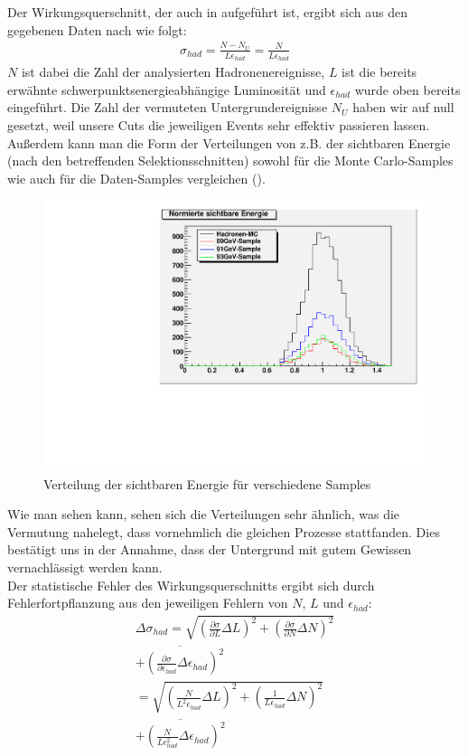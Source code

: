 Der Wirkungsquerschnitt, der auch in  aufgeführt ist, ergibt sich aus den gegebenen Daten nach \cite[Gl.13]{script} wie folgt:
\begin{eqnarray}
\sigma_{had} = \frac{N - N_U}{L\epsilon_{had}} = \frac{N}{L\epsilon_{had}}
\end{eqnarray}
$N$ ist dabei die Zahl der analysierten Hadronenereignisse, $L$ ist die bereits erwähnte schwerpunktsenergieabhängige Luminosität und $\epsilon_{had}$ wurde oben bereits eingeführt. Die Zahl der vermuteten Untergrundereignisse $N_U$ haben wir auf null gesetzt, weil unsere Cuts die jeweiligen Events sehr effektiv passieren lassen. Außerdem kann man die Form der Verteilungen von z.B. der sichtbaren Energie (nach den betreffenden Selektionsschnitten) sowohl für die Monte Carlo-Samples wie auch für die Daten-Samples vergleichen ().
\begin{figure}[htb]
	\centering
	\includegraphics[width=1\columnwidth,keepaspectratio]{Evis_vgl.pdf}
	\caption{Verteilung der sichtbaren Energie für verschiedene Samples}
	\label{fig:Evis_vgl}
\end{figure}
Wie man sehen kann, sehen sich die Verteilungen sehr ähnlich, was die Vermutung nahelegt, dass vornehmlich die gleichen Prozesse stattfanden. Dies bestätigt uns in der Annahme, dass der Untergrund mit gutem Gewissen vernachlässigt werden kann.\\
Der statistische Fehler des Wirkungsquerschnitts ergibt sich durch Fehlerfortpflanzung aus den jeweiligen Fehlern von $N$, $L$ und $\epsilon_{had}$:
\begin{equation}
  \begin{split}
    \Delta\sigma_{had} =  \sqrt{\left( \frac{\partial\sigma}{\partial L}\Delta L\right)^2 + \left( \frac{\partial\sigma}{\partial N}\Delta N\right)^2} \\
    \overline{+ \left( \frac{\partial\sigma}{\partial \epsilon_{had}}\Delta\epsilon_{had} \right)^2} \\
    = \sqrt{\left( \frac{N}{L^2\epsilon_{had}}\Delta L\right)^2 + \left( \frac{1}{L\epsilon_{had}}\Delta N\right)^2} \\
    \overline{+ \left( \frac{N}{L \epsilon_{had}^2}\Delta\epsilon_{had} \right)^2}
  \end{split}
\end{equation}

